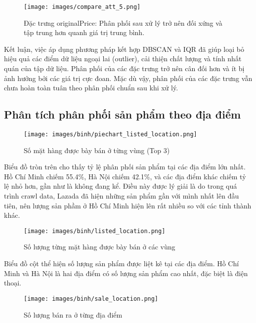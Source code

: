 \begin{figure}[H]
    \centering
    \texttt{[image: images/compare\_att\_5.png]}
    \caption{Đặc trưng originalPrice: Phân phối sau xử lý trở nên đối xứng và tập trung hơn quanh giá trị trung bình.}
    \label{fig:piechart_item_listed}
\end{figure}

Kết luận, việc áp dụng phương pháp kết hợp DBSCAN và IQR đã giúp loại bỏ hiệu quả các điểm dữ liệu ngoại lai (outlier), cải thiện chất lượng và tính nhất quán của tập dữ liệu. Phân phối của các đặc trưng trở nên cân đối hơn và ít bị ảnh hưởng bởi các giá trị cực đoan. Mặc dù vậy, phân phối của các đặc trưng vẫn chưa hoàn toàn tuân theo phân phối chuẩn sau khi xử lý.

\subsection{Phân tích phân phối sản phẩm theo địa điểm}

\begin{figure}[H]
    \centering
    \texttt{[image: images/binh/piechart\_listed\_location.png]}
    \caption{Số mặt hàng được bày bán ở từng vùng (Top 3)}
    \label{fig:piechart_item_listed}
\end{figure}

Biểu đồ tròn trên cho thấy tỷ lệ phân phối sản phẩm tại các địa điểm lớn nhất. Hồ Chí Minh chiếm 55.4\%, Hà Nội chiếm 42.1\%, và các địa điểm khác chiếm tỷ lệ nhỏ hơn, gần như là không đang kể. Điều này được lý giải là do trong quá trình crawl data, Lazada đã hiện những sản phẩm gần với mình nhất lên đầu tiên, nên lượng sản phầm ở Hồ Chí Minh hiện lên rất nhiều so với các tỉnh thành khác.

\begin{figure}[H]
    \centering
    \texttt{[image: images/binh/listed\_location.png]}
    \caption{Số lượng từng mặt hàng được bày bán ở các vùng}
    \label{fig:item_listed}
\end{figure}

Biểu đồ cột thể hiện số lượng sản phẩm được liệt kê tại các địa điểm. Hồ Chí Minh và Hà Nội là hai địa điểm có số lượng sản phẩm cao nhất, đặc biệt là điện thoại.

\begin{figure}[H]
    \centering
    \texttt{[image: images/binh/sale\_location.png]}
    \caption{Số lượng bán ra ở từng địa điểm}
    \label{fig:sale_location}
\end{figure}

